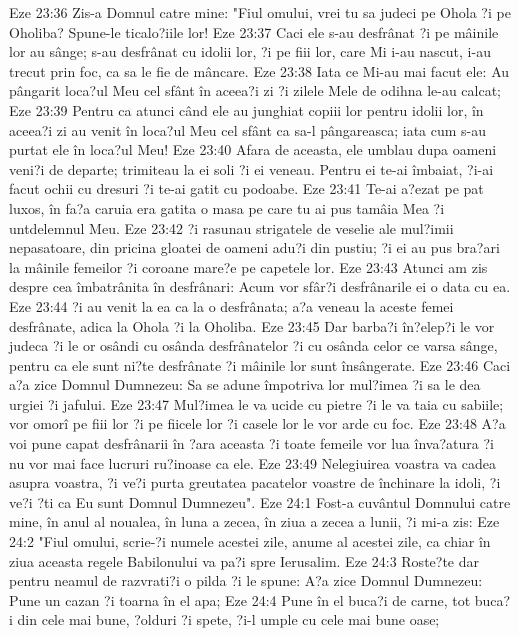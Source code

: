 Eze 23:36  Zis-a Domnul catre mine: "Fiul omului, vrei tu sa judeci pe Ohola ?i pe Oholiba? Spune-le ticalo?iile lor!
Eze 23:37  Caci ele s-au desfrânat ?i pe mâinile lor au sânge; s-au desfrânat cu idolii lor, ?i pe fiii lor, care Mi i-au nascut, i-au trecut prin foc, ca sa le fie de mâncare.
Eze 23:38  Iata ce Mi-au mai facut ele: Au pângarit loca?ul Meu cel sfânt în aceea?i zi ?i zilele Mele de odihna le-au calcat;
Eze 23:39  Pentru ca atunci când ele au junghiat copiii lor pentru idolii lor, în aceea?i zi au venit în loca?ul Meu cel sfânt ca sa-l pângareasca; iata cum s-au purtat ele în loca?ul Meu!
Eze 23:40  Afara de aceasta, ele umblau dupa oameni veni?i de departe; trimiteau la ei soli ?i ei veneau. Pentru ei te-ai îmbaiat, ?i-ai facut ochii cu dresuri ?i te-ai gatit cu podoabe.
Eze 23:41  Te-ai a?ezat pe pat luxos, în fa?a caruia era gatita o masa pe care tu ai pus tamâia Mea ?i untdelemnul Meu.
Eze 23:42  ?i rasunau strigatele de veselie ale mul?imii nepasatoare, din pricina gloatei de oameni adu?i din pustiu; ?i ei au pus bra?ari la mâinile femeilor ?i coroane mare?e pe capetele lor.
Eze 23:43  Atunci am zis despre cea îmbatrânita în desfrânari: Acum vor sfâr?i desfrânarile ei o data cu ea.
Eze 23:44  ?i au venit la ea ca la o desfrânata; a?a veneau la aceste femei desfrânate, adica la Ohola ?i la Oholiba.
Eze 23:45  Dar barba?i în?elep?i le vor judeca ?i le or osândi cu osânda desfrânatelor ?i cu osânda celor ce varsa sânge, pentru ca ele sunt ni?te desfrânate ?i mâinile lor sunt însângerate.
Eze 23:46  Caci a?a zice Domnul Dumnezeu: Sa se adune împotriva lor mul?imea ?i sa le dea urgiei ?i jafului.
Eze 23:47  Mul?imea le va ucide cu pietre ?i le va taia cu sabiile; vor omorî pe fiii lor ?i pe fiicele lor ?i casele lor le vor arde cu foc.
Eze 23:48  A?a voi pune capat desfrânarii în ?ara aceasta ?i toate femeile vor lua înva?atura ?i nu vor mai face lucruri ru?inoase ca ele.
Eze 23:49  Nelegiuirea voastra va cadea asupra voastra, ?i ve?i purta greutatea pacatelor voastre de închinare la idoli, ?i ve?i ?ti ca Eu sunt Domnul Dumnezeu".
Eze 24:1  Fost-a cuvântul Domnului catre mine, în anul al noualea, în luna a zecea, în ziua a zecea a lunii, ?i mi-a zis:
Eze 24:2  "Fiul omului, scrie-?i numele acestei zile, anume al acestei zile, ca chiar în ziua aceasta regele Babilonului va pa?i spre Ierusalim.
Eze 24:3  Roste?te dar pentru neamul de razvrati?i o pilda ?i le spune: A?a zice Domnul Dumnezeu: Pune un cazan ?i toarna în el apa;
Eze 24:4  Pune în el buca?i de carne, tot buca?i din cele mai bune, ?olduri ?i spete, ?i-l umple cu cele mai bune oase;
